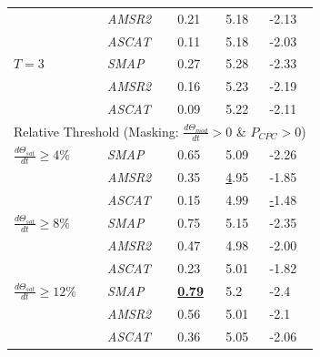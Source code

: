 \documentclass[hess, manuscript]{copernicus}
\begin{document}
\begin{table}[t]
\begin{tabular}{@{}lllll@{}}
 & \textit{AMSR2} & 0.21 & 5.18 & -2.13 \\
 & \textit{ASCAT} & 0.11 & 5.18 & -2.03 \\
$T=3$ & \textit{SMAP} & 0.27 & 5.28 & -2.33 \\
 & \textit{AMSR2} & 0.16 & 5.23 & -2.19 \\
 & \textit{ASCAT} & 0.09 & 5.22 & -2.11 \\ \midrule
\multicolumn{5}{c}{Relative Threshold (Masking: $\frac{d\Theta_{mod}}{dt} > 0$ \& $P_{CPC} > 0$)} \\ \midrule
$\frac{d\Theta_{sat}}{dt} \geqslant 4\%$ & \textit{SMAP} & 0.65 & 5.09 & -2.26 \\
 & \textit{AMSR2} & 0.35 & {\ul 4.95} & -1.85 \\
 & \textit{ASCAT} & 0.15 & 4.99 & {\ul -1.48} \\
$\frac{d\Theta_{sat}}{dt} \geqslant 8\%$ & \textit{SMAP} & 0.75 & 5.15 & -2.35 \\
 & \textit{AMSR2} & 0.47 & 4.98 & -2.00 \\
 & \textit{ASCAT} & 0.23 & 5.01 & -1.82 \\
$\frac{d\Theta_{sat}}{dt} \geqslant 12\%$ & \textit{SMAP} & {\ul \textbf{0.79}} & 5.2 & -2.4 \\
 & \textit{AMSR2} & 0.56 & 5.01 & -2.1 \\
\textit{} & \textit{ASCAT} & 0.36 & 5.05 & -2.06 \\ \bottomrule
\end{tabular}
\end{table}

\clearpage
\end{document}
